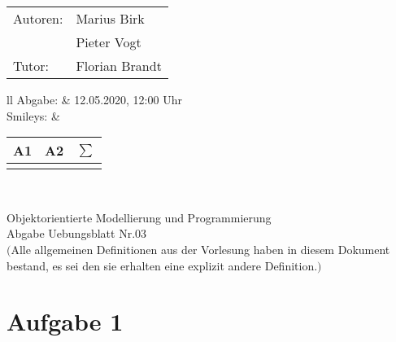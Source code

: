 \documentclass[12pt,a4paper,oneside,ngerman]{article}
\newcommand{\fach}{Objektorientierte Modellierung und Programmierung}
\newcommand{\dokumentenTitel}{Abgabe Uebungsblatt Nr.03}
\newcommand{\Abgabe}{12.05.2020, 12:00 Uhr}
\newcommand{\memberOne}{Marius Birk}
\newcommand{\memberTwo}{Pieter Vogt}
\newcommand{\tutor}{ Florian Brandt }
\begin{document}
	\thispagestyle{plain} %
	
	\begin{multicols}{2} %
		\hspace{-1cm} %
		\begin{tabular}{ll} %
			Autoren: & \memberOne \\ %
			& \memberTwo \\
			Tutor: & \tutor \\  
		\end{tabular}
		
		\columnbreak %
		\hspace{-1cm} %
		\begin{tabular}{ll} %
			Abgabe: & \Abgabe \\ %
			Smileys: &  
			\renewcommand{\arraystretch}{1.2} 
			\begin{tabular}{|p{0.8cm}|p{0.8cm}|p{0.8cm}|}
				\hline A1 & A2 & $\sum\limits^{ }$ \\ \hline
				& & \\ \hline    
			\end{tabular} \\
		\end{tabular}
		
	\end{multicols} %
	
	\begin{center}
		\Large{\fach} \\
		\LARGE{\dokumentenTitel} \\
		\small
		$($Alle allgemeinen Definitionen aus der Vorlesung haben in diesem Dokument bestand, es sei den sie erhalten eine explizit andere Definition.$)$
	\end{center}
\section*{Aufgabe 1}
\end{document}
